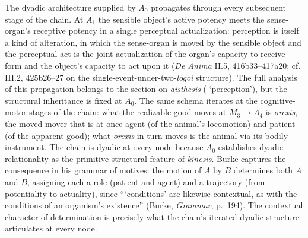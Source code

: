 The dyadic architecture supplied by $A_0$ propagates through every subsequent stage of the chain. At $A_1$ the sensible object's active potency meets the sense-organ's receptive potency in a single perceptual actualization: perception is itself a kind of alteration, in which the sense-organ is moved by the sensible object and the perceptual act is the joint actualization of the organ's capacity to receive form and the object's capacity to act upon it (\textit{De Anima} II.5, 416b33--417a20; cf. III.2, 425b26--27 on the single-event-under-two-\textit{logoi} structure). The full analysis of this propagation belongs to the section on \textit{aisthēsis} ( `perception'), but the structural inheritance is fixed at $A_0$. The same schema iterates at the cognitive-motor stages of the chain: what the realizable good moves at $M_3 \rightarrow A_4$ is \textit{orexis}, the moved mover that is at once agent (of the animal's locomotion) and patient (of the apparent good); what \textit{orexis} in turn moves is the animal via its bodily instrument. The chain is dyadic at every node because $A_0$ establishes dyadic relationality as the primitive structural feature of \textit{kinēsis}. Burke captures the consequence in his grammar of motives: the motion of $A$ by $B$ determines both $A$ and $B$, assigning each a role (patient and agent) and a trajectory (from potentiality to actuality), since ```conditions' are likewise contextual, as with the conditions of an organism's existence'' (Burke, \textit{Grammar}, p.~194). The contextual character of determination is precisely what the chain's iterated dyadic structure articulates at every node.

